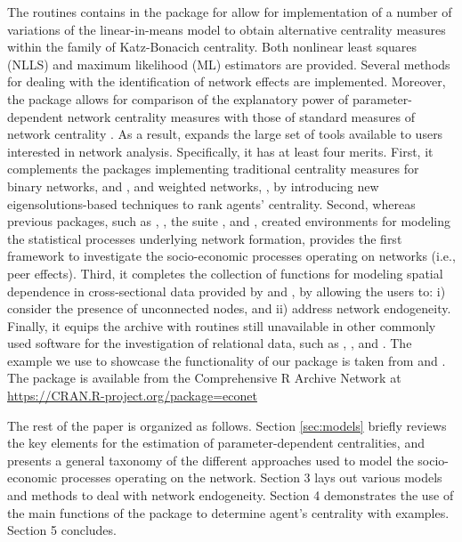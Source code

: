 \documentclass[nojss]{jss}
\begin{document}
The routines contains in the package  for  \citep{R} allow for implementation of a number of variations of the linear-in-means model to obtain alternative centrality measures within the family of Katz-Bonacich centrality. Both nonlinear least squares (NLLS) and maximum likelihood (ML) estimators are provided. Several methods for dealing with the identification of network effects are implemented. Moreover, the  package allows for comparison of the explanatory power of parameter-dependent network centrality measures with those of standard measures of network centrality \citep{Wasserman+Faust:1994}. As a result,  expands the large set of tools available to  users interested in network analysis. Specifically, it has at least four merits. First, it complements the  packages implementing traditional centrality measures for binary networks,  \citep{igraph} and  \citep{sna}, and weighted networks,  \citep{tnet}, by introducing new eigensolutions-based techniques to rank agents' centrality. Second, whereas previous packages, such as  \citep{btergm},  \citep{hergm}, the  suite \citep{statnet}, and  \citep{xergm}, created environments for modeling the statistical processes underlying network formation,  provides the first framework to investigate the socio-economic processes operating on networks (i.e., peer effects). Third, it completes the collection of functions for modeling spatial dependence in cross-sectional data provided by  \citep{spdep} and  \citep{splm}, by allowing the users to: i) consider the presence of unconnected nodes, and ii) address network endogeneity. Finally, it equips the  archive with routines still unavailable in other commonly used software for the investigation of relational data, such as  \citep{MATLAB},  \citep{Batagelj:2003},  \citep{Python} and  \citep{Stata}. The example we use to showcase the functionality of our  package is taken from \cite{Battaglini+Patacchini:2018} and \cite{Battaglini+Sciabolazza+Patacchini:2018}. The  package  is available from the Comprehensive R Archive Network at \url{https://CRAN.R-project.org/package=econet} 

The rest of the paper is organized as follows. Section \ref{sec:models} briefly reviews the key elements for the estimation of parameter-dependent centralities, and presents a general taxonomy of the different approaches used to model the socio-economic processes operating on the network. Section 3 lays out various models and methods to deal with network endogeneity. Section 4 demonstrates the use of the main functions of the package  to determine agent's centrality with examples. Section 5 concludes.
\end{document}
